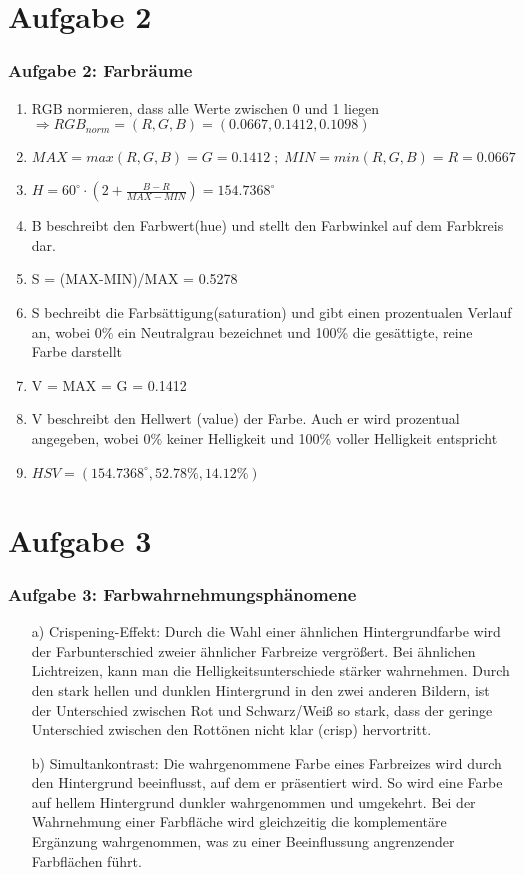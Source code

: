 \documentclass[accentcolor=tud9c,colorbacktitle,inverttitle,landscape,german,presentation,t]{tudbeamer}
\begin{document}
\section{Aufgabe 2}
	\begin{frame}
		\frametitle{Aufgabe 2: Farbräume}
			\begin{enumerate}
			\item RGB normieren, dass alle Werte zwischen 0 und 1 liegen
			$\Rightarrow RGB_{norm} = (R, G, B) = (0.0667, 0.1412, 0.1098)$
			\item $MAX = max(R, G, B) = G = 0.1412 \; ; \; MIN = min(R, G, B) = R = 0.0667$
			\item  $H = 60 ^{\circ} \cdot (2 + \frac{B-R}{MAX-MIN}) = 154.7368^{\circ}$
			\item  B beschreibt den Farbwert(hue) und stellt den Farbwinkel auf dem Farbkreis dar.
			\item S = (MAX-MIN)/MAX = 0.5278
			\item S bechreibt die Farbsättigung(saturation) und gibt einen prozentualen Verlauf an, wobei 0\% ein Neutralgrau bezeichnet und 100\% die gesättigte, reine Farbe darstellt \
			\item V = MAX = G = 0.1412
			\item V beschreibt den Hellwert (value) der Farbe. Auch er wird prozentual angegeben, wobei 0\% keiner Helligkeit und 100\% voller Helligkeit entspricht
			\item $HSV = (154.7368^{\circ}, 52.78\%, 14.12\%)$
			\end{enumerate}
		\end{frame}

\section{Aufgabe 3}
	\begin{frame}
		\frametitle{Aufgabe 3: Farbwahrnehmungsphänomene}
		\begin{itemize}
			\item[a)]Crispening-Effekt: Durch die Wahl einer ähnlichen Hintergrundfarbe wird der Farbunterschied zweier ähnlicher Farbreize vergrößert. Bei ähnlichen Lichtreizen, kann man die Helligkeitsunterschiede stärker wahrnehmen. Durch den stark hellen und dunklen Hintergrund in den zwei anderen Bildern, ist der Unterschied zwischen Rot und Schwarz/Weiß so stark, dass der geringe Unterschied zwischen den Rottönen nicht klar (crisp) hervortritt.
			\item[b)]Simultankontrast: Die wahrgenommene Farbe eines Farbreizes wird durch den Hintergrund beeinflusst, auf dem er präsentiert wird. So wird eine Farbe auf hellem Hintergrund dunkler wahrgenommen und umgekehrt. Bei der Wahrnehmung einer Farbfläche wird gleichzeitig die komplementäre Ergänzung wahrgenommen, was zu einer  Beeinflussung angrenzender Farbflächen führt.
		\end{itemize}
	\end{frame}
\end{document}
